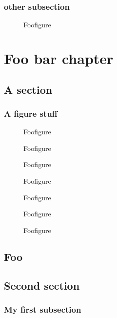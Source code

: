 \documentclass{book}
\begin{document}
\subsection{other subsection}

\begin{figure}
\caption{Foofigure}
\end{figure}

\FloatBarrier


\chapter{Foo bar chapter}


\section{A section}

\subsection{ A figure stuff}
\begin{figure}
\caption{Foofigure}
\end{figure}
\begin{figure}
\caption{Foofigure}
\end{figure}
\begin{figure}
\caption{Foofigure}
\end{figure}
\begin{figure}
\caption{Foofigure}
\end{figure}
\begin{figure}
\caption{Foofigure}
\end{figure}
\begin{figure}
\caption{Foofigure}
\end{figure}
\begin{figure}
\caption{Foofigure}
\end{figure}



\section{Foo}

\section{Second section}

\subsection{My first subsection}
\end{document}
